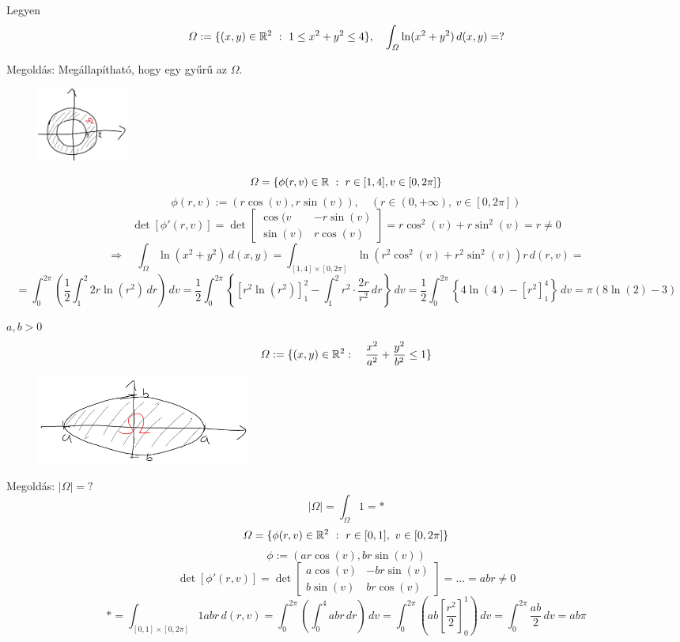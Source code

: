 \documentclass[a4paper,11.5pt]{article}
\begin{document}
	\begin{task}
		Legyen
		\[ \varOmega:=\{ (x,y)\in\R^2\ : \ 1\leq x^2+y^2\leq4 \},\quad \int_{\varOmega}^{}\ln(x^2+y^2)\,d(x,y)=? \]
		
		Megoldás: Megállapítható, hogy egy gyűrű az $\varOmega$.
		\begin{figure}[H]
			\centering
			\includegraphics[width=3cm]{kepek/03.png}
			\caption{}
		\end{figure}
		
		\[ \varOmega=\{ \phi(r,v)\in\R\ :\ r\in[1,4],v\in[0,2\pi] \} \]
		\[ \phi(r,v):=\left(r\cos(v),r\sin(v)\right),\quad (r\in(0,+\infty),\ v\in[0,2\pi]) \]
		\[ \det[\phi'(r,v)]=\det \begin{bmatrix}
			\cos(v&-r\sin(v)\\
			\sin(v)&r\cos(v)
		\end{bmatrix}=r\cos^2(v)+r\sin^2(v)=r\not=0 \]
		\[\Rightarrow\quad \int_{\varOmega}^{}\ln(x^2+y^2)\,d(x,y)=\int_{[1,4]\times[0,2\pi]}^{}\ln(r^2\cos^2(v)+r^2\sin^2(v))r\,d(r,v)=\]
		\[=\int_{0}^{2\pi}\left(\frac{1}{2}\int_{1}^{2}2r\ln(r^2)\,dr\right)\,dv=\frac{1}{2}\int_{0}^{2\pi}\left\{[r^2\ln(r^2)]_1^2-\int_{1}^{2}r^2\cdot\frac{2r}{r^2}\,dr\right\}\,dv=\frac{1}{2}\int_0^{2\pi}\left\{4\ln(4)-[r^2]_1^4 \right\}\,dv=\pi(8\ln(2)-3) \] 
	\end{task}
	\begin{task}
		$a,b>0$
		\[ \varOmega:=\{ (x,y)\in\mathbb{R}^2:\quad \frac{x^2}{a^2}+\frac{y^2}{b^2}\leq1 \} \]
		\begin{figure}[h]
			\centering
			\includegraphics[width=7cm]{kepek/04.png}
			\caption{}
		\end{figure}
		
		Megoldás: $|\varOmega|=?$
		\[ |\varOmega|=\int_{\varOmega}^{}1=* \]
		\[ \varOmega=\{ \phi(r,v)\in\R^2\ : \ r\in[0,1],\ v\in[0,2\pi] \} \]
		\[ \phi:=(ar\cos(v),br\sin(v)) \]
		\[ \det[\phi'(r,v)]=\det \begin{bmatrix}
			a\cos(v)&-br\sin(v)\\
			b\sin(v)&br\cos(v)
		\end{bmatrix}=\ldots=abr\not=0 \]
		\[ *=\int_{[0,1]\times[0,2\pi]}^{}1abr\,d(r,v)=\int_{0}^{2\pi}\left(\int_0^4abr\,dr\right)\,dv=\int_0^{2\pi}\left(ab\left[\frac{r^2}{2}\right]_0^1\right)\,dv=\int_0^{2\pi}\frac{ab}{2}\,dv=ab\pi \]
	\end{task}
\end{document}
